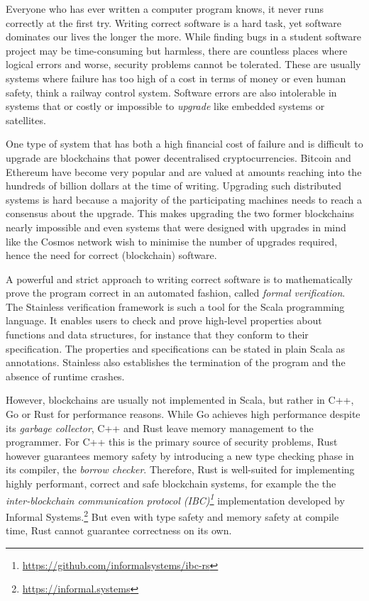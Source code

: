 Everyone who has ever written a computer program knows, it never runs correctly
at the first try. Writing correct software is a hard task, yet software
dominates our lives the longer the more. While finding bugs in a student
software project may be time-consuming but harmless, there are countless places
where logical errors and worse, security problems cannot be tolerated. These are
usually systems where failure has too high of a cost in terms of money or even
human safety, think a railway control system. Software errors are also
intolerable in systems that or costly or impossible to \emph{upgrade} like
embedded systems or satellites.

One type of system that has both a high financial cost of failure and is
difficult to upgrade are blockchains that power decentralised cryptocurrencies.
Bitcoin \cite{bitcoin} and Ethereum \cite{ethereum} have become very popular and
are valued at amounts reaching into the hundreds of billion dollars at the time
of writing. Upgrading such distributed systems is hard because a majority of the
participating machines needs to reach a consensus about the upgrade. This makes
upgrading the two former blockchains nearly impossible and even systems that
were designed with upgrades in mind like the Cosmos network \cite{cosmos} wish
to minimise the number of upgrades required, hence the need for correct
(blockchain) software.

A powerful and strict approach to writing correct software is to mathematically
prove the program correct in an automated fashion, called \emph{formal
verification}. The Stainless verification framework \cite{stainless} is such a
tool for the Scala programming language. It enables users to check and prove
high-level properties about functions and data structures, for instance that
they conform to their specification. The properties and specifications can be
stated in plain Scala as annotations. Stainless also establishes the termination
of the program and the absence of runtime crashes.

However, blockchains are usually not implemented in Scala, but rather in C++, Go
or Rust for performance reasons. While Go achieves high performance despite its
\emph{garbage collector}, C++ and Rust leave memory management to the
programmer. For C++ this is the primary source of security problems, Rust
however guarantees memory safety by introducing a new type checking phase in its
compiler, the \emph{borrow checker}. Therefore, Rust is well-suited for
implementing highly performant, correct and safe blockchain systems, for example
the  the \emph{inter-blockchain communication protocol
(IBC)\footnote{\url{https://github.com/informalsystems/ibc-rs}}} implementation
developed by Informal Systems.\footnote{\url{https://informal.systems}} But even
with type safety and memory safety at compile time, Rust cannot guarantee
correctness on its own.


